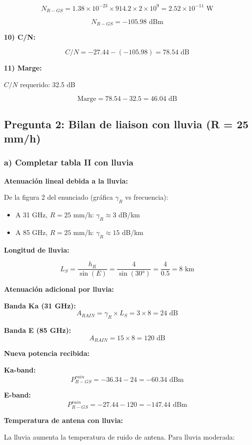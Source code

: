 \documentclass[12pt,a4paper]{extarticle}
\begin{document}
$$N_{R-GS} = 1.38 \times 10^{-23} \times 914.2 \times 2 \times 10^9 = 2.52 \times 10^{-11} \text{ W}$$

$$N_{R-GS} = -105.98 \text{ dBm}$$

\textbf{10) C/N:}

$$C/N = -27.44 - (-105.98) = 78.54 \text{ dB}$$

\textbf{11) Marge:}

$C/N$ requerido: 32.5 dB

$$\text{Marge} = 78.54 - 32.5 = 46.04 \text{ dB}$$

\subsection*{Pregunta 2: Bilan de liaison con lluvia (R = 25 mm/h)}

\subsubsection*{a) Completar tabla II con lluvia}

\textbf{Atenuación lineal debida a la lluvia:}

De la figura 2 del enunciado (gráfica $\gamma_R$ vs frecuencia):

\begin{itemize}
    \item A 31 GHz, $R = 25$ mm/h: $\gamma_R \approx 3$ dB/km
    \item A 85 GHz, $R = 25$ mm/h: $\gamma_R \approx 15$ dB/km
\end{itemize}

\textbf{Longitud de lluvia:}

$$L_S = \frac{h_R}{\sin(E)} = \frac{4}{\sin(30°)} = \frac{4}{0.5} = 8 \text{ km}$$

\textbf{Atenuación adicional por lluvia:}

\textbf{Banda Ka (31 GHz):}
$$A_{RAIN} = \gamma_R \times L_S = 3 \times 8 = 24 \text{ dB}$$

\textbf{Banda E (85 GHz):}
$$A_{RAIN} = 15 \times 8 = 120 \text{ dB}$$

\textbf{Nueva potencia recibida:}

\textbf{Ka-band:}
$$P_{R-GS}^{rain} = -36.34 - 24 = -60.34 \text{ dBm}$$

\textbf{E-band:}
$$P_{R-GS}^{rain} = -27.44 - 120 = -147.44 \text{ dBm}$$

\textbf{Temperatura de antena con lluvia:}

La lluvia aumenta la temperatura de ruido de antena. Para lluvia moderada:
\end{document}
